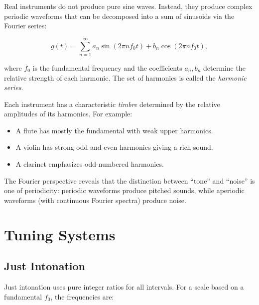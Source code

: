 \documentclass[11pt]{article}
\theoremstyle{definition}
\begin{document}
Real instruments do not produce pure sine waves. Instead, they produce complex periodic waveforms that can be decomposed into a sum of sinusoids via the Fourier series:

\begin{equation}
    g(t) = \sum_{n=1}^{\infty} a_n \sin(2\pi n f_0 t) + b_n \cos(2\pi n f_0 t),
    \label{eq:fourier}
\end{equation}

where $f_0$ is the fundamental frequency and the coefficients $a_n, b_n$ determine the relative strength of each harmonic. The set of harmonics is called the \emph{harmonic series}.

\begin{center}
\end{center}

Each instrument has a characteristic \emph{timbre} determined by the relative amplitudes of its harmonics. For example:
\begin{itemize}
    \item A flute has mostly the fundamental with weak upper harmonics.
    \item A violin has strong odd and even harmonics giving a rich sound.
    \item A clarinet emphasizes odd-numbered harmonics.
\end{itemize}

The Fourier perspective reveals that the distinction between ``tone'' and ``noise'' is one of periodicity: periodic waveforms produce pitched sounds, while aperiodic waveforms (with continuous Fourier spectra) produce noise.

\section{Tuning Systems}

\subsection{Just Intonation}

Just intonation uses pure integer ratios for all intervals. For a scale based on a fundamental $f_0$, the frequencies are:
\end{document}
